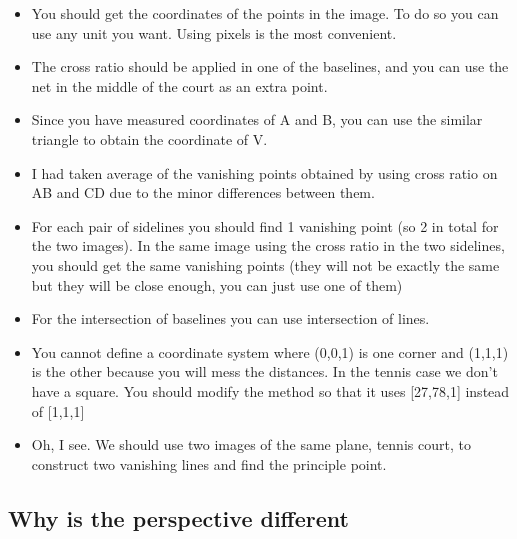 \documentclass[12pt, oneside]{article}
\begin{document}
\begin{itemize}
  \item You should get the coordinates of the points in the image. To do so you can use 
      any unit you want. Using pixels is the most convenient. 
  \item The cross ratio should  be applied in one of the baselines, and you can use 
      the net in the middle of the court as an extra point.
  \item Since you have measured coordinates of A and B, you can use the similar triangle 
      to obtain the coordinate of V.
  \item I had taken average of the vanishing points obtained by using cross ratio on AB 
      and CD due to the minor differences between them.
  \item For each pair of sidelines you should find 1 vanishing point (so 2 in total 
      for the two images). In the same image using the cross ratio in the two sidelines, 
      you  should get the same vanishing points (they will not be exactly the same but 
      they will be close enough, you can just use one of them)
  \item For the intersection of baselines you can use intersection of lines.
  \item You cannot define a coordinate system where (0,0,1) is one corner and (1,1,1) 
      is the other because you will mess the distances. In the tennis case we don't 
      have a square. You should modify the method so that it uses [27,78,1] 
      instead of [1,1,1]
  \item  Oh, I see. We should use two images of the same plane, tennis court, to construct 
      two vanishing lines and find the principle point.
\end{itemize}


\subsection{Why is the perspective different}
\end{document}

